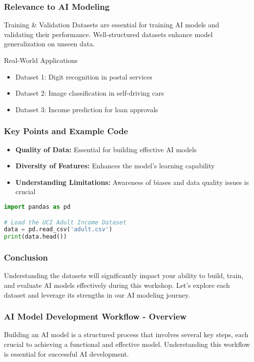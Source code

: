 \documentclass{beamer}
\begin{document}
\begin{frame}[fragile]
    \frametitle{Relevance to AI Modeling}
    \begin{block}{Training \& Validation}
        Datasets are essential for training AI models and validating their performance. Well-structured datasets enhance model generalization on unseen data.
    \end{block}

    \begin{block}{Real-World Applications}
        \begin{itemize}
            \item Dataset 1: Digit recognition in postal services
            \item Dataset 2: Image classification in self-driving cars
            \item Dataset 3: Income prediction for loan approvals
        \end{itemize}
    \end{block}
\end{frame}

\begin{frame}[fragile]
    \frametitle{Key Points and Example Code}
    \begin{itemize}
        \item \textbf{Quality of Data:} Essential for building effective AI models
        \item \textbf{Diversity of Features:} Enhances the model's learning capability
        \item \textbf{Understanding Limitations:} Awareness of biases and data quality issues is crucial
    \end{itemize}

    \begin{lstlisting}[language=Python]
import pandas as pd

# Load the UCI Adult Income Dataset
data = pd.read_csv('adult.csv')
print(data.head())
    \end{lstlisting}
\end{frame}

\begin{frame}[fragile]
    \frametitle{Conclusion}
    Understanding the datasets will significantly impact your ability to build, train, and evaluate AI models effectively during this workshop. Let’s explore each dataset and leverage its strengths in our AI modeling journey.
\end{frame}

\begin{frame}

\frametitle{AI Model Development Workflow - Overview}

Building an AI model is a structured process that involves several key steps, each crucial to achieving a functional and effective model. Understanding this workflow is essential for successful AI development.

\end{frame}
\end{document}
